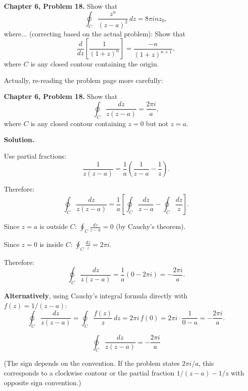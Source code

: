 \documentclass[12pt]{article}
\begin{document}
\textbf{Chapter 6, Problem 18.} Show that
\[
\oint_C \frac{z^n}{(z-a)^2}\,dz = 8\pi i n z_0,
\]
where... (correcting based on the actual problem): Show that
\[
\frac{d}{dz}\left[\frac{1}{(1+z)^n}\right] = \frac{-n}{(1+z)^{n+1}},
\]
where $C$ is any closed contour containing the origin.

Actually, re-reading the problem page more carefully:

\textbf{Chapter 6, Problem 18.} Show that
\[
\oint_C \frac{dz}{z(z-a)} = \frac{2\pi i}{a},
\]
where $C$ is any closed contour containing $z = 0$ but not $z = a$.

\bigskip
\textbf{Solution.}

Use partial fractions:
\[
\frac{1}{z(z-a)} = \frac{1}{a}\left(\frac{1}{z-a} - \frac{1}{z}\right).
\]

Therefore:
\[
\oint_C \frac{dz}{z(z-a)} = \frac{1}{a}\left[\oint_C\frac{dz}{z-a} - \oint_C\frac{dz}{z}\right].
\]

Since $z = a$ is outside $C$: $\oint_C \frac{dz}{z-a} = 0$ (by Cauchy's theorem).

Since $z = 0$ is inside $C$: $\oint_C \frac{dz}{z} = 2\pi i$.

Therefore:
\[
\oint_C \frac{dz}{z(z-a)} = \frac{1}{a}(0 - 2\pi i) = -\frac{2\pi i}{a}.
\]

\textbf{Alternatively}, using Cauchy's integral formula directly with $f(z) = 1/(z-a)$:
\[
\oint_C \frac{dz}{z(z-a)} = \oint_C \frac{f(z)}{z}\,dz = 2\pi i\,f(0) = 2\pi i \cdot \frac{1}{0-a} = -\frac{2\pi i}{a}.
\]

\[
\boxed{\oint_C \frac{dz}{z(z-a)} = -\frac{2\pi i}{a}}
\]

(The sign depends on the convention. If the problem states $2\pi i/a$, this corresponds to a clockwise contour or the partial fraction $1/(z-a) - 1/z$ with opposite sign convention.)
\end{document}
